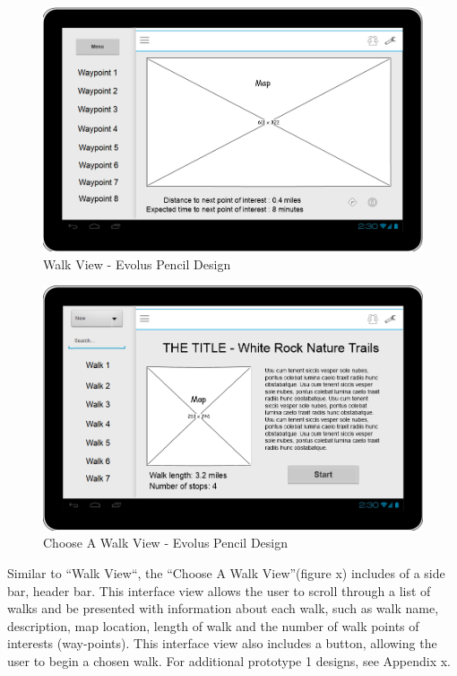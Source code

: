 \documentclass[11pt,a4paper]{article}
\begin{document}
\begin{figure}[h!]
\begin{center}
\includegraphics[width=12cm]{./img/pencil_proto1.jpg}
\caption{Walk View - Evolus Pencil Design} 
\end{center}
\end{figure}

\begin{figure}[h!]
\begin{center}
\includegraphics[width=12cm]{./img/pencil_choose_walk.jpg}
\caption{Choose A Walk View - Evolus Pencil Design} 
\end{center}
\end{figure}


Similar to ``Walk View``, the ``Choose A Walk View''(figure x) includes of a side bar, header bar. This interface view allows the user to scroll through a list of walks and be presented with information about each walk, such as walk name, description, map location, length of walk and the number of walk points of interests (way-points). This interface view also includes a button, allowing the user to begin a chosen walk. For additional prototype 1 designs, see Appendix x. 
\end{document}
